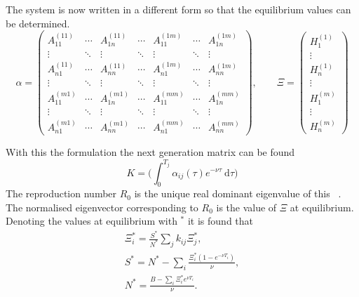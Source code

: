 \documentclass[DIV=15]{scrartcl}
\begin{document}
The system is now written in a different form so that the equilibrium values can be determined.
 \begin{equation*}
\alpha = \begin{pmatrix}
A_{11}^{(11)}& \cdots & A_{1n}^{(11)} & \cdots & A_{11}^{(1m)} & \cdots & A_{1n}^{(1m)} \\
\vdots & \ddots & \vdots & \ddots & \vdots & \ddots & \vdots \\ 
 A_{n1}^{(11)}& \cdots & A_{nn}^{(11)} & \cdots & A_{n1}^{(1m)} & \cdots & A_{nn}^{(1m)} \\
\vdots & \ddots & \vdots & \ddots & \vdots & \ddots & \vdots \\  
A_{11}^{(m1)}& \cdots & A_{1n}^{(m1)} & \cdots & A_{11}^{(mm)} & \cdots & A_{1n}^{(mm)} \\
\vdots & \ddots & \vdots & \ddots & \vdots & \ddots & \vdots \\ 
 A_{n1}^{(m1)}& \cdots & A_{nn}^{(m1)} & \cdots & A_{n1}^{(mm)} & \cdots & A_{nn}^{(mm)}
\end{pmatrix}, \qquad
\Xi =\begin{pmatrix} H_{1}^{(1)}\\ \vdots \\ H_n^{(1)} \\ \vdots \\ H_1^{(m)}  \\ \vdots \\ H_n^{(m)} \end{pmatrix} 
\label{gamma}
\end{equation*}


With this the formulation the next generation  matrix  can be found~\cite{diekmann1990,lythgoe2013}
  \begin{equation*}
   K = \bigg( \int_0^{T_j}\alpha_{ij}(\tau) e^{-\nu \tau} \ \text{d} \tau \bigg)
  \end{equation*}
 The reproduction  number $R_0$ is the unique real dominant eigenvalue of this~\cite{diekmann1990,diekmann2013} . The  normalised eigenvector  corresponding to  $R_0$ is the value of $ \Xi$ at equilibrium.  Denoting the values at equilibrium with $^*$  it  is found that 
 \begin{gather*}
 \Xi_i^*  = \frac{S^*}{N^*} \sum_j k_{ij}\Xi_j^*, \\
 S^* =  N^* - \sum_i \frac{\Xi _i^*(1-e^{-\nu T_i})}{\nu},\\
 N^* = \frac{B-\sum_i \Xi _i^* e^{\nu T_i}}{\nu}.
 \end{gather*}
 
 
\end{document}
